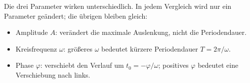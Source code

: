 \noindent\begin{minipage}{\linewidth}
Die drei Parameter wirken unterschiedlich. In jedem Vergleich wird
nur ein Parameter geändert; die übrigen bleiben gleich:
\begin{itemize}
  \item Amplitude $A$: verändert die maximale Auslenkung,
    nicht die Periodendauer.
  \item Kreisfrequenz $\omega$: größeres $\omega$ bedeutet kürzere
    Periodendauer $T=2\pi/\omega$.
  \item Phase $\varphi$: verschiebt den Verlauf um
    $t_0=-\varphi/\omega$; positives $\varphi$ bedeutet eine Verschiebung nach links.
\end{itemize}
\medskip
\begin{center}
\end{center}
\end{minipage}\par
